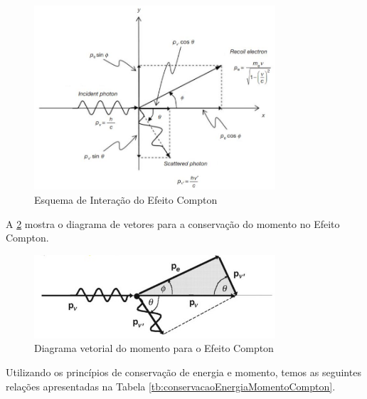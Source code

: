\documentclass[11pt,a4paper]{article}
\begin{document}
                \begin{figure}[h]
                    \centering
                    \includegraphics[width=0.8\textwidth]{Imagens/esquemaEfeitoCompton.JPG}
                    \caption{Esquema de Interação do Efeito Compton}
                    \label{fig:esquemaEfeitoCompton}
                \end{figure}

    A \ref{fig:diagramaMomentoEfeitoCompton} mostra o diagrama de vetores para a conservação do momento no Efeito Compton.

                \begin{figure}[h]
                    \centering
                    \includegraphics[width=0.8\textwidth]{Imagens/esquemaVetorialMomentoEfeitoCompton.jpg}
                    \caption{Diagrama vetorial do momento para o Efeito Compton}
                    \label{fig:diagramaMomentoEfeitoCompton}
                \end{figure}


    Utilizando os princípios de conservação de energia e momento, temos as seguintes relações apresentadas na Tabela \ref{tb:conservacaoEnergiaMomentoCompton}.
\end{document}
